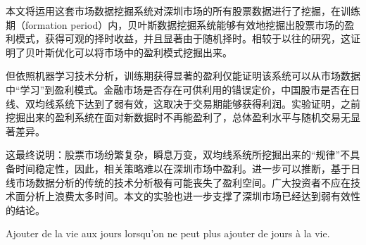 \documentclass[twoside,longtitle]{LZUthesis}
\begin{document}
本文将运用这套市场数据挖掘系统对深圳市场的所有股票数据进行了挖掘，在训练期（formation period）内，贝叶斯数据挖掘系统能够有效地挖掘出股票市场的盈利模式，获得可观的择时收益，并且显著由于随机择时。相较于以往的研究，这证明了贝叶斯优化可以将市场中的盈利模式挖掘出来。

但依照机器学习技术分析，训练期获得显著的盈利仅能证明该系统可以从市场数据中“学习”到盈利模式。金融市场是否存在可供利用的错误定价，中国股市是否在日线、双均线系统下达到了弱有效，这取决于交易期能够获得利润。实验证明，之前挖掘出来的盈利系统在面对新数据时不再能盈利了，总体盈利水平与随机交易无显著差异。

这最终说明：股票市场纷繁复杂，瞬息万变，双均线系统所挖掘出来的“规律”不具备时间稳定性，因此，相关策略难以在深圳市场中盈利。进一步可以推断，基于日线市场数据分析的传统的技术分析极有可能丧失了盈利空间。广大投资者不应在技术面分析上浪费太多时间。本文的实验也进一步支撑了深圳市场已经达到弱有效性的结论。





\appendix





\begin{thanks}
Ajouter de la vie aux jours lorsqu'on ne peut plus ajouter de jours
à la vie.

\end{thanks}
\end{document}
